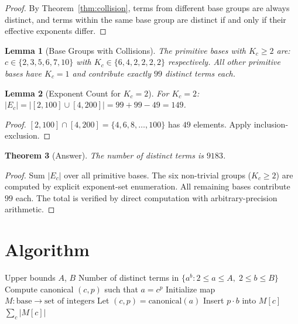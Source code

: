 \documentclass[12pt,a4paper]{article}
\newtheorem{theorem}{Theorem}
\newtheorem{lemma}[theorem]{Lemma}
\theoremstyle{definition}
\begin{document}
\begin{proof}
By Theorem~\ref{thm:collision}, terms from different base groups are always distinct, and terms within the same base group are distinct if and only if their effective exponents differ.
\end{proof}

\begin{lemma}[Base Groups with Collisions]\label{lem:groups}
The primitive bases with $K_c \geq 2$ are: $c \in \{2, 3, 5, 6, 7, 10\}$ with $K_c \in \{6, 4, 2, 2, 2, 2\}$ respectively. All other primitive bases have $K_c = 1$ and contribute exactly $99$ distinct terms each.
\end{lemma}

\begin{lemma}[Exponent Count for $K_c = 2$]\label{lem:k2}
For $K_c = 2$: $|E_c| = |[2,100] \cup [4,200]| = 99 + 99 - 49 = 149$.
\end{lemma}

\begin{proof}
$[2,100] \cap [4,200] = \{4, 6, 8, \ldots, 100\}$ has $49$ elements. Apply inclusion-exclusion.
\end{proof}

\begin{theorem}[Answer]\label{thm:answer}
The number of distinct terms is $9183$.
\end{theorem}

\begin{proof}
Sum $|E_c|$ over all primitive bases. The six non-trivial groups ($K_c \geq 2$) are computed by explicit exponent-set enumeration. All remaining bases contribute $99$ each. The total is verified by direct computation with arbitrary-precision arithmetic.
\end{proof}

\section{Algorithm}

\begin{algorithm}[H]
\caption{Distinct Powers via Canonical Representation}
\begin{algorithmic}[1]
\REQUIRE Upper bounds $A$, $B$
\ENSURE Number of distinct terms in $\{a^b : 2 \leq a \leq A, \; 2 \leq b \leq B\}$
    \STATE Compute canonical $(c, p)$ such that $a = c^p$
\ENDFOR
\STATE Initialize map $M : \text{base} \to \text{set of integers}$
    \STATE Let $(c, p) = \text{canonical}(a)$
        \STATE Insert $p \cdot b$ into $M[c]$
    \ENDFOR
\ENDFOR
\RETURN $\sum_{c} |M[c]|$
\end{algorithmic}
\end{algorithm}
\end{document}
